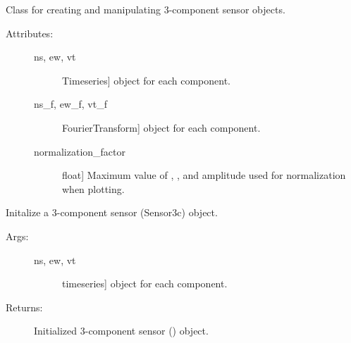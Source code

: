 \documentclass[letterpaper,10pt,english,openany,oneside]{sphinxmanual}
\begin{document}
\begin{fulllineitems}
\label{\detokenize{index:hvsrpy.Sensor3c}}
Class for creating and manipulating 3-component sensor objects.
\begin{description}
\item[{Attributes:}] \leavevmode\begin{description}
\item[{ns, ew, vt}] \leavevmode{[}Timeseries{]}
 object for each component.

\item[{ns\_f, ew\_f, vt\_f}] \leavevmode{[}FourierTransform{]}
 object for each component.

\item[{normalization\_factor}] \leavevmode{[}float{]}
Maximum value of , , and  amplitude used for
normalization when plotting.

\end{description}

\end{description}

\begin{fulllineitems}
\label{\detokenize{index:hvsrpy.Sensor3c.__init__}}
Initalize a 3-component sensor (Sensor3c) object.
\begin{description}
\item[{Args:}] \leavevmode\begin{description}
\item[{ns, ew, vt}] \leavevmode{[}timeseries{]}
 object for each component.

\end{description}

\item[{Returns:}] \leavevmode
Initialized 3-component sensor () object.

\end{description}

\end{fulllineitems}



\end{fulllineitems}
\end{document}
